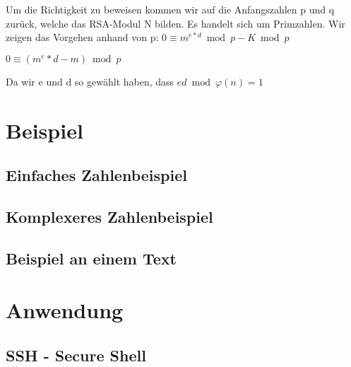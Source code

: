 Um die Richtigkeit zu beweisen kommen wir auf die Anfangszahlen p und q zurück, welche das RSA-Modul N bilden. Es handelt sich um Primzahlen. Wir zeigen das Vorgehen anhand von p:
$ 0 \equiv m^{e*d} \bmod p - K \bmod p $

$ 0 \equiv (m^e*d-m) \bmod p $

Da wir e und d so gewählt haben, dass 
$ ed \bmod \varphi(n) = 1 $ 


\section{Beispiel}
\subsection{Einfaches Zahlenbeispiel}
\subsection{Komplexeres Zahlenbeispiel}
\subsection{Beispiel an einem Text}
\section{Anwendung}
\subsection{SSH - Secure Shell}
